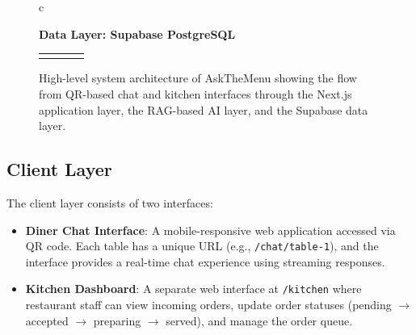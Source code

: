 \begin{figure}[t]
\begin{tabular}{c}
{{            \textbf{Data Layer: Supabase PostgreSQL}\\[4pt]
            \begin{tabular}{cccc}
                \fbox{\parbox{0.19\textwidth}{\centering
                    \textbf{MenuItem}\\
                    Structured menu data
                }}
                &
                \fbox{\parbox{0.19\textwidth}{\centering
                    \textbf{MenuItemEmbedding}\\
                    3072-d vectors
                }}
                &
                \fbox{\parbox{0.19\textwidth}{\centering
                    \textbf{Chat / Message}\\
                    Conversation records
                }}
                &
                \fbox{\parbox{0.19\textwidth}{\centering
                    \textbf{Order / OrderItem}\\
                    Kitchen workflow
                }}
            \end{tabular}
        }}
    \end{tabular}
    \endgroup
    \caption{High-level system architecture of AskTheMenu showing the flow from QR-based chat and kitchen interfaces through the Next.js application layer, the RAG-based AI layer, and the Supabase data layer.}\label{fig:architecture}
\end{figure}

\subsection{Client Layer}
The client layer consists of two interfaces:
\begin{itemize}
    \item \textbf{Diner Chat Interface}: A mobile-responsive web application accessed via QR code. Each table has a unique URL (e.g., \texttt{/chat/table-1}), and the interface provides a real-time chat experience using streaming responses.
    \item \textbf{Kitchen Dashboard}: A separate web interface at \texttt{/kitchen} where restaurant staff can view incoming orders, update order statuses (pending $\rightarrow$ accepted $\rightarrow$ preparing $\rightarrow$ served), and manage the order queue.
\end{itemize}


